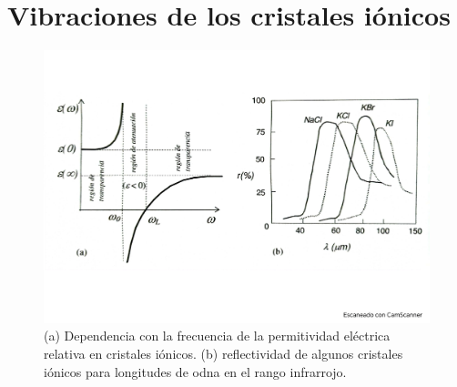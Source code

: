 \section{Vibraciones de los cristales iónicos}
\begin{figure}[h!] \centering
    \includegraphics[scale=0.5]{Cuerpo/Ch_04/Fotos libro 8.pdf}
    \caption{(a) Dependencia con la frecuencia de la permitividad eléctrica relativa en cristales iónicos. (b) reflectividad de algunos cristales iónicos para longitudes de odna en el rango infrarrojo.}
    \label{Fig:04-08}
\end{figure}    
